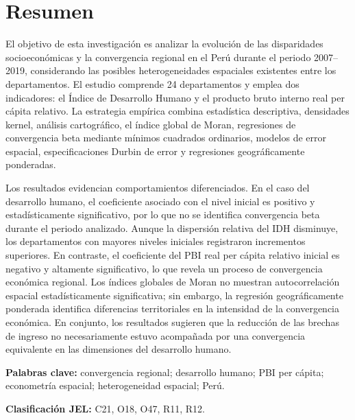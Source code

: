\section*{Resumen}

El objetivo de esta investigación es analizar la evolución de las disparidades
socioeconómicas y la convergencia regional en el Perú durante el periodo
2007--2019, considerando las posibles heterogeneidades espaciales existentes
entre los departamentos. El estudio comprende 24 departamentos y emplea dos
indicadores: el Índice de Desarrollo Humano y el producto bruto interno real
per cápita relativo. La estrategia empírica combina estadística descriptiva,
densidades kernel, análisis cartográfico, el índice global de Moran, regresiones
de convergencia beta mediante mínimos cuadrados ordinarios, modelos de error
espacial, especificaciones Durbin de error y regresiones geográficamente
ponderadas.

Los resultados evidencian comportamientos diferenciados. En el caso del
desarrollo humano, el coeficiente asociado con el nivel inicial es positivo y
estadísticamente significativo, por lo que no se identifica convergencia beta
durante el periodo analizado. Aunque la dispersión relativa del IDH disminuye,
los departamentos con mayores niveles iniciales registraron incrementos
superiores. En contraste, el coeficiente del PBI real per cápita relativo
inicial es negativo y altamente significativo, lo que revela un proceso de
convergencia económica regional. Los índices globales de Moran no muestran
autocorrelación espacial estadísticamente significativa; sin embargo, la
regresión geográficamente ponderada identifica diferencias territoriales en la
intensidad de la convergencia económica. En conjunto, los resultados sugieren
que la reducción de las brechas de ingreso no necesariamente estuvo acompañada
por una convergencia equivalente en las dimensiones del desarrollo humano.

\vspace{0.3cm}

\noindent\textbf{Palabras clave:} convergencia regional; desarrollo humano;
PBI per cápita; econometría espacial; heterogeneidad espacial; Perú.

\vspace{0.4cm}

\noindent\textbf{Clasificación JEL:} C21, O18, O47, R11, R12.
